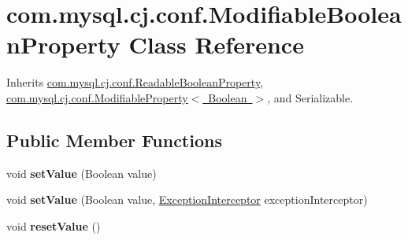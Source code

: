 \hypertarget{classcom_1_1mysql_1_1cj_1_1conf_1_1_modifiable_boolean_property}{}\section{com.\+mysql.\+cj.\+conf.\+Modifiable\+Boolean\+Property Class Reference}
\label{classcom_1_1mysql_1_1cj_1_1conf_1_1_modifiable_boolean_property}


Inherits \mbox{\hyperlink{classcom_1_1mysql_1_1cj_1_1conf_1_1_readable_boolean_property}{com.\+mysql.\+cj.\+conf.\+Readable\+Boolean\+Property}}, \mbox{\hyperlink{interfacecom_1_1mysql_1_1cj_1_1conf_1_1_modifiable_property}{com.\+mysql.\+cj.\+conf.\+Modifiable\+Property$<$ Boolean $>$}}, and Serializable.

\subsection*{Public Member Functions}
\begin{DoxyCompactItemize}
\item 
\mbox{\label{classcom_1_1mysql_1_1cj_1_1conf_1_1_modifiable_boolean_property_aae3d70277b6a1ca62bd6332d52555f86}} 
void {\bfseries set\+Value} (Boolean value)
\item 
\mbox{\label{classcom_1_1mysql_1_1cj_1_1conf_1_1_modifiable_boolean_property_a69e5fe878019d88d2445d88f402a41f0}} 
void {\bfseries set\+Value} (Boolean value, \mbox{\hyperlink{interfacecom_1_1mysql_1_1cj_1_1exceptions_1_1_exception_interceptor}{Exception\+Interceptor}} exception\+Interceptor)
\item 
\mbox{\label{classcom_1_1mysql_1_1cj_1_1conf_1_1_modifiable_boolean_property_a805e761180b7f07f5223557c70eacd46}} 
void {\bfseries reset\+Value} ()
\end{DoxyCompactItemize}
